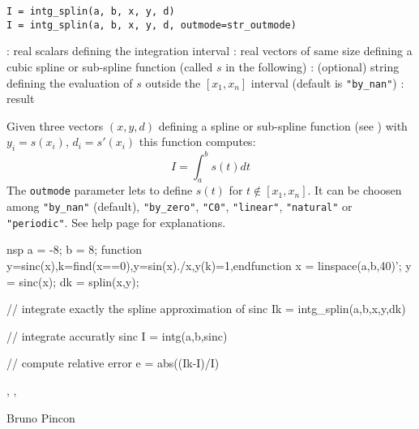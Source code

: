 
\begin{mandesc}
\end{mandesc}

\begin{calling_sequence}
    \begin{verbatim}
I = intg_splin(a, b, x, y, d)
I = intg_splin(a, b, x, y, d, outmode=str_outmode)
    \end{verbatim}
\end{calling_sequence}

\begin{parameters}
  \begin{varlist}
   : real scalars defining the integration interval
   : real vectors of same size defining a cubic spline or sub-spline function 
                (called $s$ in the following)
                : (optional) string defining the evaluation of $s$ outside the $[x_1,x_n]$ interval
                (default is \verb+"by_nan"+)
   : result
  \end{varlist}
\end{parameters}

\begin{mandescription}
    Given three vectors $(x,y,d)$ defining a spline or sub-spline function
    (see  ) with $y_i=s(x_i)$, $d_i = s'(x_i)$ this function
    computes:
$$
    I = \int_a^b s(t) dt
$$
    The \verb!outmode! parameter lets to define $s(t)$ for $t \notin [x_1,x_n]$.
 It can be choosen among \verb+"by_nan"+ (default),  \verb+"by_zero"+,  \verb+"C0"+,
    \verb+"linear"+,  \verb+"natural"+ or  \verb+"periodic"+. See 
 help page for explanations.

  \end{mandescription}

  \begin{examples}

\begin{mintednsp}{nsp}
a = -8; b = 8;
function y=sinc(x),k=find(x==0),y=sin(x)./x,y(k)=1,endfunction
x = linspace(a,b,40)';
y = sinc(x);
dk = splin(x,y);

// integrate exactly the spline approximation of sinc
Ik = intg_splin(a,b,x,y,dk)

// integrate accuratly sinc 
I = intg(a,b,sinc)

// compute relative error
e = abs((Ik-I)/I)
\end{mintednsp}

\end{examples}

\begin{manseealso}
, , 
\end{manseealso}

\begin{authors}
    Bruno Pincon
\end{authors}

